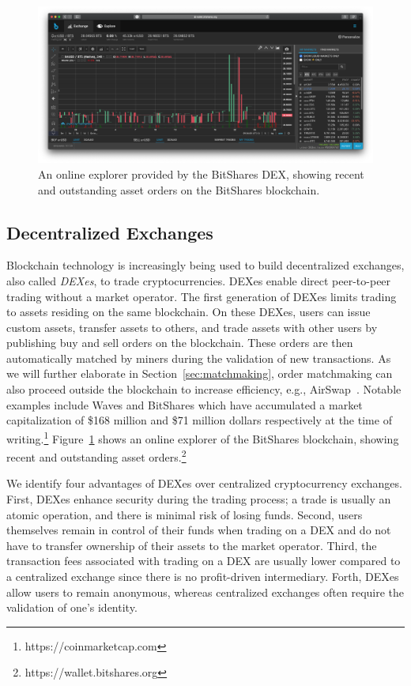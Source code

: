 \begin{figure}[t]
	\centering
	\includegraphics[width=\linewidth]{introduction/assets/bitshares}
	\caption{An online explorer provided by the BitShares DEX, showing recent and outstanding asset orders on the BitShares blockchain.}
	\label{fig:bitshares_explorer}
\end{figure}

\subsection{Decentralized Exchanges}
Blockchain technology is increasingly being used to build decentralized exchanges, also called \emph{DEXes}, to trade cryptocurrencies.
DEXes enable direct peer-to-peer trading without a market operator.
The first generation of DEXes limits trading to assets residing on the same blockchain.
On these DEXes, users can issue custom assets, transfer assets to others, and trade assets with other users by publishing buy and sell orders on the blockchain.
These orders are then automatically matched by miners during the validation of new transactions.
As we will further elaborate in Section~\ref{sec:matchmaking}, order matchmaking can also proceed outside the blockchain to increase efficiency, e.g., AirSwap~\cite{swap}.
Notable examples include Waves and BitShares which have accumulated a market capitalization of \$168 million and \$71 million dollars respectively at the time of writing.\footnote{https://coinmarketcap.com}
Figure~\ref{fig:bitshares_explorer} shows an online explorer of the BitShares blockchain, showing recent and outstanding asset orders.\footnote{https://wallet.bitshares.org}

We identify four advantages of DEXes over centralized cryptocurrency exchanges.
First, DEXes enhance security during the trading process; a trade is usually an atomic operation, and there is minimal risk of losing funds.
Second, users themselves remain in control of their funds when trading on a DEX and do not have to transfer ownership of their assets to the market operator.
Third, the transaction fees associated with trading on a DEX are usually lower compared to a centralized exchange since there is no profit-driven intermediary.
Forth, DEXes allow users to remain anonymous, whereas centralized exchanges often require the validation of one's identity.

